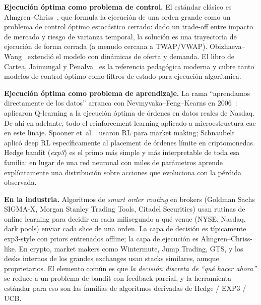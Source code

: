\documentclass[journal,onecolumn,11pt]{IEEEtran}
\begin{document}
\medskip

\noindent
\textbf{Ejecución óptima como problema de control.} El estándar
clásico es Almgren--Chriss~\cite{almgren2001}, que formula la
ejecución de una orden grande como un problema de control óptimo
estocástico cerrado: dado un trade-off entre impacto de mercado y
riesgo de varianza temporal, la solución es una trayectoria de
ejecución de forma cerrada (a menudo cercana a TWAP/VWAP).
Obizhaeva--Wang~\cite{obizhaeva2013} extendió el modelo con
dinámicas de oferta y demanda. El libro de Cartea, Jaimungal y
Penalva~\cite{cartea2015} es la referencia pedagógica
moderna y cubre tanto modelos de control óptimo como filtros de
estado para ejecución algorítmica.

\medskip

\noindent
\textbf{Ejecución óptima como problema de aprendizaje.} La rama
``aprendamos directamente de los datos'' arranca con
Nevmyvaka--Feng--Kearns en 2006~\cite{nevmyvaka2006}: aplicaron
Q-learning a la ejecución óptima de órdenes en datos reales de
Nasdaq. De ahí en adelante, todo el reinforcement learning aplicado
a microestructura cae en este linaje. Spooner et~al.~\cite{spooner2018}
usaron RL para market making; Schnaubelt~\cite{schnaubelt2022} aplicó
deep RL específicamente al placement de órdenes límite en
criptomonedas. Hedge bandit (\emph{exp3}) es el primo más simple y
más interpretable de toda esa familia: en lugar de una red neuronal
con miles de parámetros aprende explícitamente una distribución
sobre acciones que evoluciona con la pérdida observada.

\medskip

\noindent
\textbf{En la industria.} Algoritmos de \emph{smart order routing}
en brokers (Goldman Sachs SIGMA-X, Morgan Stanley Trading Tools,
Citadel Securities) usan rutinas de online learning para decidir
en cada milisegundo a qué venue (NYSE, Nasdaq, dark pools) enviar
cada slice de una orden. La capa de decisión es típicamente
exp3-style con priors entrenados offline; la capa de ejecución
es Almgren--Chriss-like. En crypto, market makers como Wintermute,
Jump Trading, GTS, y los desks internos de los grandes exchanges
usan stacks similares, aunque proprietarios. El elemento común es
que \emph{la decisión discreta de ``qué hacer ahora''} se reduce a
un problema de bandit con feedback parcial, y la herramienta
estándar para eso son las familias de algoritmos derivadas de
Hedge / EXP3 / UCB.

\medskip
\end{document}
